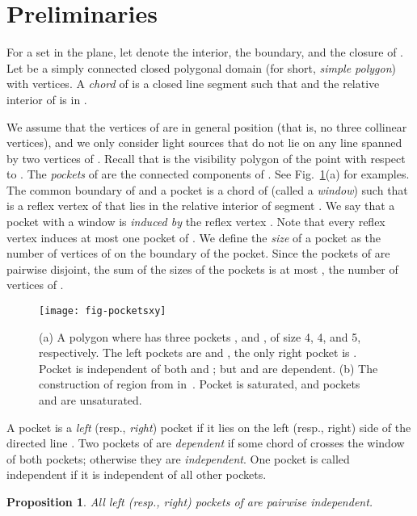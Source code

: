 \documentclass[12pt]{article}
\newtheorem{proposition}{Proposition}
\begin{document}
\section{Preliminaries}
\label{sec:prelim}


For a set  in the plane, let  denote the interior,  the boundary, and  the closure of . Let  be a simply connected closed polygonal domain (for short, \emph{simple polygon}) with  vertices. A \emph{chord} of  is a closed line segment  such that  and the relative interior of  is in .

We assume that the vertices of  are in general position (that is, no three collinear vertices), and we only consider light sources  that do not lie on any line spanned by two vertices of . Recall that  is the visibility polygon of the point  with respect to .
The \emph{pockets} of  are the connected components of .
See Fig.~\ref{fig:pockets}(a) for examples.
The common boundary of  and a pocket is a chord  of  (called a \emph{window}) such that  is a reflex vertex of  that lies in the relative interior of segment . We say that a pocket with a window  is \emph{induced by} the reflex vertex . Note that every reflex vertex induces at most one pocket of . We define the \emph{size} of a pocket as the number of vertices of  on the boundary of the pocket. Since the pockets of  are pairwise disjoint, the sum of the sizes of the pockets is at most , the number of vertices of .

\begin{figure}[ht]
  \centering
  \texttt{[image: fig-pocketsxy]}
  \caption{\label{fig:pockets}
(a) A polygon  where  has three pockets ,  and ,
    of size 4, 4, and 5, respectively. The left pockets are  and ,
   the only right pocket is . Pocket  is independent of
   both  and ; but  and  are dependent.
(b) The construction of region  from  in~\cite{Us}.
Pocket  is saturated, and pockets  and  are unsaturated.}
\end{figure}

A pocket is a \emph{left} (resp., \emph{right}) pocket if it lies on the left (resp., right) side of the directed line . Two pockets of  are \emph{dependent} if some chord of  crosses the window of both pockets; otherwise they are \emph{independent}.
One pocket is called independent if it is independent of all other pockets.

\begin{proposition} \label{prop:independent}
All left (resp., right) pockets of  are pairwise independent.
\end{proposition}
\end{document}
